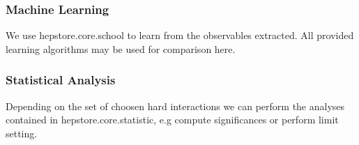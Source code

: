 \subsubsection{Machine Learning}
We use hepstore.core.school to learn from the observables
extracted. All provided learning algorithms may be used for comparison
here.

\subsubsection{Statistical Analysis}
Depending on the set of choosen hard interactions we can perform the
analyses contained in hepstore.core.statistic, e.g compute
significances or perform limit setting.
